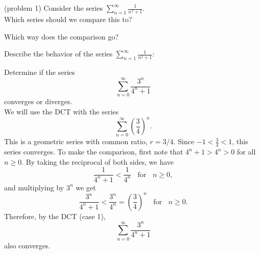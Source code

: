 \documentclass[handout]{ximera}
\begin{document}
\begin{problem}(problem 1)
Consider the series $\displaystyle{\sum_{n=1}^\infty \frac{1}{n^3 + 1}}$.\\
Which series should we compare this to?
\begin{center}
\begin{multipleChoice}
\choice{\[\sum_{n=1}^\infty \frac{1}{n^2}\]}
\choice[correct]{\[\sum_{n=1}^\infty \frac{1}{n^3}\]}
\choice{\[\sum_{n=1}^\infty \frac{1}{3^n}\]}
\end{multipleChoice}
\end{center}

Which way does the comparison go?
\begin{center}
\begin{multipleChoice}
\end{multipleChoice}
\end{center}

Describe the behavior of the series $\displaystyle{\sum_{n=1}^\infty \frac{1}{n^3 + 1}:}$
\begin{center}
\begin{multipleChoice}
\end{multipleChoice}
\end{center}

\end{problem}


\begin{example}[example 2] %
Determine if the series 
\[
\sum_{n=0}^\infty \frac{3^n}{4^n + 1}
\]
 converges or diverges.\\
We will use the DCT with the series 
\[
\sum_{n=0}^\infty \left(\frac34\right)^n.
\]
 This is a geometric series with common ratio, $r = 3/4$. Since $-1 < \frac 34 < 1$, this series converges.
To make the comparison, first note that $4^n + 1 > 4^n > 0$ for all $n \geq 0$. By taking the reciprocal of both sides,
we have 
\[
\frac{1}{4^n + 1} < \frac{1}{4^n} \; \; \text{ for } \;\; n \geq 0,
\]
and multiplying by $3^n$ we get
\[
\frac{3^n}{4^n + 1} < \frac{3^n}{4^n} = \left(\frac34\right)^n \;\; \text{ for } \;\; n \geq 0.
\]
Therefore, by the DCT (case 1), 
\[
\sum_{n=0}^\infty \frac{3^n}{4^n + 1}
\]
 also converges.
\end{example}
\end{document}
